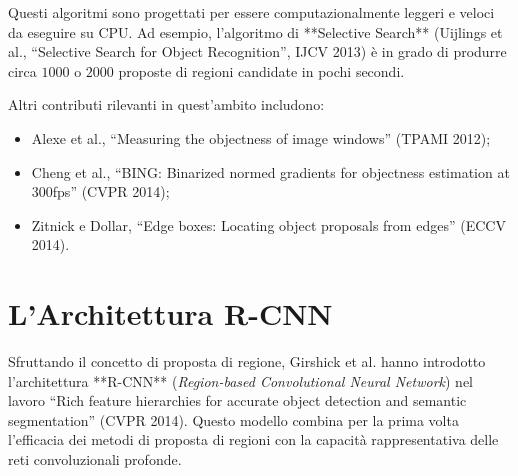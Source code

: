 ﻿\documentclass[11pt, a4paper]{article}
\begin{document}
Questi algoritmi sono progettati per essere computazionalmente leggeri e veloci da eseguire su CPU. Ad esempio, l'algoritmo di **Selective Search** (Uijlings et al., ``Selective Search for Object Recognition'', IJCV 2013) è in grado di produrre circa $1000$ o $2000$ proposte di regioni candidate in pochi secondi.

Altri contributi rilevanti in quest'ambito includono:
\begin{itemize}[noitemsep]
    \item Alexe et al., ``Measuring the objectness of image windows'' (TPAMI 2012);
    \item Cheng et al., ``BING: Binarized normed gradients for objectness estimation at 300fps'' (CVPR 2014);
    \item Zitnick e Dollar, ``Edge boxes: Locating object proposals from edges'' (ECCV 2014).
\end{itemize}

\newpage

\section{L'Architettura R-CNN}

Sfruttando il concetto di proposta di regione, Girshick et al. hanno introdotto l'architettura **R-CNN** (\emph{Region-based Convolutional Neural Network}) nel lavoro ``Rich feature hierarchies for accurate object detection and semantic segmentation'' (CVPR 2014). Questo modello combina per la prima volta l'efficacia dei metodi di proposta di regioni con la capacità rappresentativa delle reti convoluzionali profonde.

\end{document}

